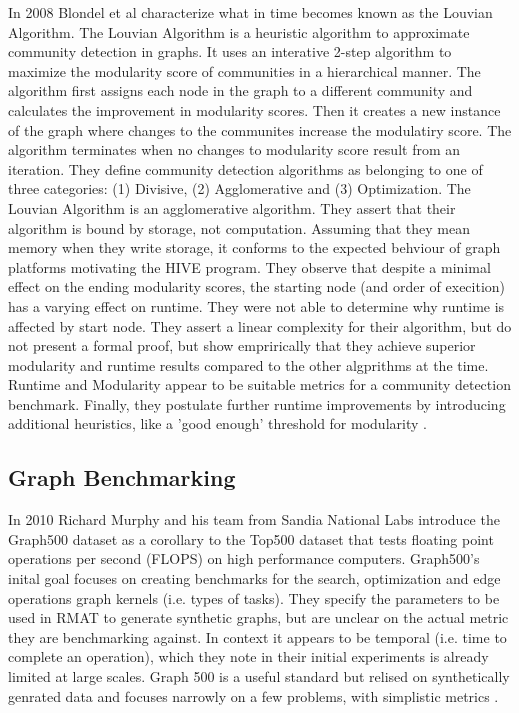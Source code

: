 \documentclass[sigconf,anonymous, authordraft]{acmart}
\begin{document}
\par{In 2008 Blondel et al characterize what in time becomes known as the Louvian Algorithm. 
The Louvian Algorithm is a heuristic algorithm to approximate community detection in graphs. 
It uses an interative 2-step algorithm to maximize the modularity score of communities in a hierarchical manner. 
The algorithm first assigns each node in the graph to a different community and calculates the improvement in modularity scores. 
Then it creates a new instance of the graph where changes to the communites increase the modulatiry score. 
The algorithm terminates when no changes to modularity score result from an iteration. 
They define community detection algorithms as belonging to one of three categories: (1) Divisive, (2) Agglomerative and (3) Optimization. The Louvian Algorithm is an agglomerative algorithm. 
They assert that their algorithm is bound by storage, not computation. 
Assuming that they mean memory when they write storage, it conforms to the expected behviour of graph platforms motivating the HIVE program.
They observe that despite a minimal effect on the ending modularity scores, the starting node (and order of execition) has a varying effect on runtime. 
They were not able to determine why runtime is affected by start node. 
They assert a linear complexity for their algorithm, but do not present a formal proof, but show emprirically that they achieve superior modularity and runtime results compared to the other algprithms at the time. 
Runtime and Modularity appear to be suitable metrics for a community detection benchmark. 
Finally, they postulate further runtime improvements by introducing additional heuristics, like a 'good enough' threshold for modularity \cite{Blondel2008}.}

\subsection{Graph Benchmarking}

\par{In 2010 Richard Murphy and his team from Sandia National Labs introduce the Graph500 dataset as a corollary to the Top500 dataset that tests floating point operations per second (FLOPS) on high performance computers. 
Graph500's inital goal focuses on creating benchmarks for the search, optimization and edge operations graph kernels (i.e. types of tasks).
They specify the parameters to be used in RMAT to generate synthetic graphs, but are unclear on the actual metric they are benchmarking against. 
In context it appears to be temporal (i.e. time to complete an operation), which they note in their initial experiments is already limited at large scales. 
Graph 500 is a useful standard but relised on synthetically genrated data and focuses narrowly on a few problems, with simplistic metrics \cite{Murphy2010}.}
\end{document}
